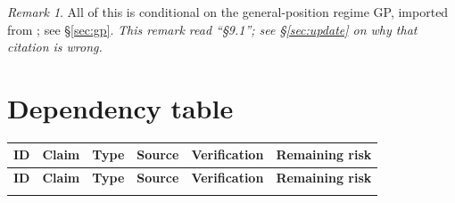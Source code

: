 \documentclass[11pt,a4paper]{article}
\theoremstyle{plain}
\theoremstyle{definition}
\theoremstyle{remark}
\newtheorem*{remark}{Remark}
\begin{document}
\begin{remark}
All of this is conditional on the general-position regime \textsf{GP}, imported
from \cite[\S9 and \S3]{AckermanKeszeghRote2022}; see \S\ref{sec:gp}. \emph{This
remark read ``\S9.1''; see \S\ref{sec:update} on why that citation is wrong.}
\end{remark}

\section{Dependency table}\label{sec:table}

{\footnotesize\setlength{\tabcolsep}{3pt}
\begin{longtable}{@{}>{\raggedright\arraybackslash}p{1.3cm}>{\raggedright\arraybackslash}p{3.5cm}>{\raggedright\arraybackslash}p{1.8cm}>{\raggedright\arraybackslash}p{2.4cm}>{\raggedright\arraybackslash}p{2.4cm}>{\raggedright\arraybackslash}p{2.8cm}@{}}
\toprule
\textbf{ID} & \textbf{Claim} & \textbf{Type} & \textbf{Source} & \textbf{Verification} & \textbf{Remaining risk} \\
\midrule
\endfirsthead
\toprule
\textbf{ID} & \textbf{Claim} & \textbf{Type} & \textbf{Source} & \textbf{Verification} & \textbf{Remaining risk} \\
\midrule
\endhead
\bottomrule
\endfoot


\end{longtable}}
\end{document}
